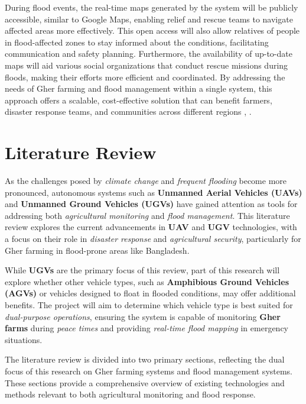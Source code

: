 \documentclass[conference]{IEEEtran}
\begin{document}
During flood events, the real-time maps generated by the system will be publicly accessible, similar to Google Maps, enabling relief and rescue teams to navigate affected areas more effectively. This open access will also allow relatives of people in flood-affected zones to stay informed about the conditions, facilitating communication and safety planning. Furthermore, the availability of up-to-date maps will aid various social organizations that conduct rescue missions during floods, making their efforts more efficient and coordinated. By addressing the needs of Gher farming and flood management within a single system, this approach offers a scalable, cost-effective solution that can benefit farmers, disaster response teams, and communities across different regions \cite{ref12}, \cite{ref13}.



\section{\textbf{Literature Review}}

As the challenges posed by \textit{climate change} and \textit{frequent flooding} become more pronounced, autonomous systems such as \textbf{Unmanned Aerial Vehicles (UAVs)} and \textbf{Unmanned Ground Vehicles (UGVs)} have gained attention as tools for addressing both \textit{agricultural monitoring} and \textit{flood management}. This literature review explores the current advancements in \textbf{UAV} and \textbf{UGV} technologies, with a focus on their role in \textit{disaster response} and \textit{agricultural security}, particularly for Gher farming in flood-prone areas like Bangladesh.

While \textbf{UGVs} are the primary focus of this review, part of this research will explore whether other vehicle types, such as \textbf{Amphibious Ground Vehicles (AGVs)} or vehicles designed to float in flooded conditions, may offer additional benefits. The project will aim to determine which vehicle type is best suited for \textit{dual-purpose operations}, ensuring the system is capable of monitoring \textbf{Gher farms} during \textit{peace times} and providing \textit{real-time flood mapping} in emergency situations.

The literature review is divided into two primary sections, reflecting the dual focus of this research on Gher farming systems and flood management systems. These sections provide a comprehensive overview of existing technologies and methods relevant to both agricultural monitoring and flood response.
\end{document}
